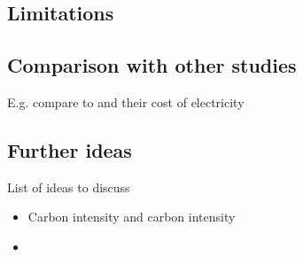 \subsection{Limitations}
\subsection{Comparison with other studies}
E.g. compare to \cite{Hampp2021} and their cost of electricity

\subsection{Further ideas}
List of ideas to discuss
\begin{itemize}
    \item Carbon intensity and carbon intensity
    \item 
\end{itemize}